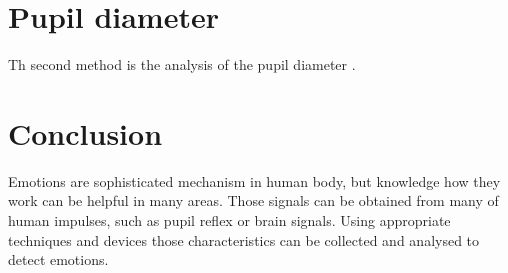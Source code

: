\documentclass[10pt,journal,compsoc,twoside]{IEEEtran}
\begin{document}
\section{Pupil diameter}
Th second method is the analysis of the pupil diameter \cite{ZhaiBarreto}. 

\section{Conclusion}

Emotions are sophisticated mechanism in human body, but knowledge how they work can be helpful in many areas. Those signals can be obtained from many of human impulses, such as pupil reflex or brain signals. Using appropriate techniques and devices those characteristics can be collected and analysed to detect emotions.
	
\end{document}
